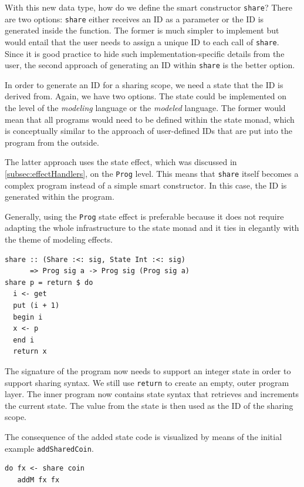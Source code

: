 \documentclass[a4paper, 11pt, fleqn, twoside, abstract=on]{scrreprt}
\newcommand{\hinl}[1]{\texttt{#1}}
\begin{document}
With this new data type, how do we define the smart constructor \hinl{share}?
There are two options: \hinl{share} either receives an ID as a parameter or the ID is generated inside the function.
The former is much simpler to implement but would entail that the user needs to assign a unique ID to each call of \hinl{share}.
Since it is good practice to hide such implementation-specific details from the user, the second approach of generating an ID within \hinl{share} is the better option.

In order to generate an ID for a sharing scope, we need a state that the ID is derived from.
Again, we have two options.
The state could be implemented on the level of the \textit{modeling} language or the \textit{modeled} language.
The former would mean that all programs would need to be defined within the state monad, which is conceptually similar to the approach of user-defined IDs that are put into the program from the outside.

The latter approach uses the state effect, which was discussed in \autoref{subsec:effectHandlers},  on the \hinl{Prog} level.
This means that \hinl{share} itself becomes a complex program instead of a simple smart constructor.
In this case, the ID is generated within the program.

Generally, using the \hinl{Prog} state effect is preferable because it does not require adapting the whole infrastructure to the state monad and it ties in elegantly with the theme of modeling effects.

\begin{verbatim}
share :: (Share :<: sig, State Int :<: sig) 
      => Prog sig a -> Prog sig (Prog sig a)
share p = return $ do 
  i <- get
  put (i + 1)
  begin i
  x <- p
  end i
  return x
\end{verbatim}

The signature of the program now needs to support an integer state in order to support sharing syntax.
We still use \hinl{return} to create an empty, outer program layer.
The inner program now contains state syntax that retrieves and increments the current state.
The value from the state is then used as the ID of the sharing scope.

The consequence of the added state code is visualized by means of the initial example \hinl{addSharedCoin}.

\begin{verbatim}
do fx <- share coin
   addM fx fx
\end{verbatim}
\end{document}
